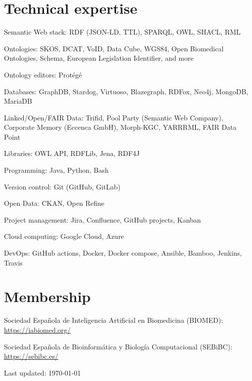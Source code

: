 \documentclass[11pt,fullpage]{article}
\renewenvironment{itemize}{
  \begin{list}{}{
    \setlength{\leftmargin}{1.5em}
  }
}{
  \end{list}
}
\begin{document}
\section*{Technical expertise}

\begin{itemize}
  \item Semantic Web stack: RDF (JSON-LD, TTL), SPARQL, OWL, SHACL, RML
  \item Ontologies: SKOS, DCAT, VoID, Data Cube, WGS84, Open Biomedical Ontologies, Schema, European Legislation Identifier, and more
  \item Ontology editors: Prot\'eg\'e 
  \item Databases: GraphDB, Stardog, Virtuoso, Blazegraph, RDFox, Neo4j, 
  MongoDB,
  MariaDB
  \item Linked/Open/FAIR Data: Trifid, Pool Party (Semantic Web Company), Corporate Memory (Eccenca GmbH), Morph-KGC, YARRRML, FAIR Data Point
  \item Libraries: OWL API, RDFLib, Jena, RDF4J
  \item Programming: Java, Python, Bash
  \item Version control: Git (GitHub, GitLab)
  \item Open Data: CKAN, Open Refine
  \item Project management: Jira, Confluence, GitHub projects, Kanban
  \item Cloud computing: Google Cloud, Azure %
  \item DevOps: GitHub actions, Docker, Docker compose, Ansible, Bamboo, Jenkins, Travis
\end{itemize}

\section*{Membership}

\begin{itemize}
  \item Sociedad Española de Inteligencia Artificial en Biomedicina (BIOMED): \href{https://iabiomed.org/}{https://iabiomed.org/}
  \item Sociedad Española de Bioinformática y Biología Computacional (SEBiBC): \href{https://sebibc.es/}{https://sebibc.es/}
\end{itemize}

\bigskip
\begin{center}
  \begin{footnotesize}
    Last updated: \today
  \end{footnotesize}
\end{center}

\end{document}
